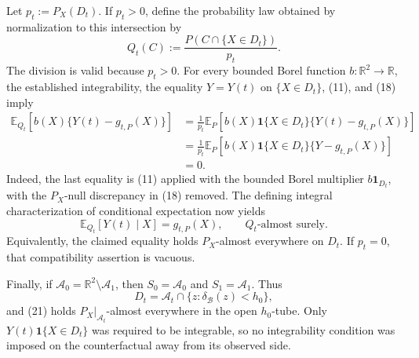 Let \(p_t:=P_X(D_t)\). If \(p_t>0\), define the probability law obtained by normalization to this intersection by
\[
 Q_t(C):=\frac{P(C\cap\{X\in D_t\})}{p_t}.
 \tag{19}
\]
The division is valid because \(p_t>0\). For every bounded Borel function \(b:\mathbb R^2\to\mathbb R\), the established integrability, the equality \(Y=Y(t)\) on \(\{X\in D_t\}\), (11), and (18) imply
\[
 \begin{aligned}
 \mathbb E_{Q_t}[b(X)\{Y(t)-g_{t,P}(X)\}]
 &=\frac{1}{p_t}\mathbb E_P\!\left[b(X)\mathbf 1\{X\in D_t\}
       \{Y(t)-g_{t,P}(X)\}\right]\\
 &=\frac{1}{p_t}\mathbb E_P\!\left[b(X)\mathbf 1\{X\in D_t\}
       \{Y-g_{t,P}(X)\}\right]\\
 &=0.
 \end{aligned}
 \tag{20}
\]
Indeed, the last equality is (11) applied with the bounded Borel multiplier \(b\mathbf 1_{D_t}\), with the \(P_X\)-null discrepancy in (18) removed. The defining integral characterization of conditional expectation now yields
\[
 \mathbb E_{Q_t}[Y(t)\mid X]=g_{t,P}(X),
 \qquad Q_t\text{-almost surely}.
 \tag{21}
\]
Equivalently, the claimed equality holds \(P_X\)-almost everywhere on \(D_t\). If \(p_t=0\), that compatibility assertion is vacuous.

Finally, if \(\mathcal A_0=\mathbb R^2\setminus\mathcal A_1\), then \(S_0=\mathcal A_0\) and \(S_1=\mathcal A_1\). Thus
\[
 D_t=\mathcal A_t\cap\{z:\delta_{\mathcal B}(z)<h_0\},
\]
and (21) holds \(P_X|_{\mathcal A_t}\)-almost everywhere in the open \(h_0\)-tube. Only \(Y(t)\mathbf 1\{X\in D_t\}\) was required to be integrable, so no integrability condition was imposed on the counterfactual away from its observed side.